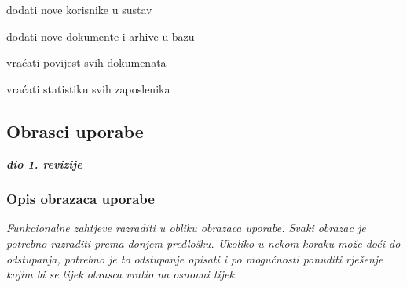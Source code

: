 \begin{packed_enum}
\begin{packed_enum}
					
				\end{packed_enum}
				
				\item  {}
				
				\begin{packed_enum}
					
					\item dodati nove korisnike u sustav
					\item dodati nove dokumente i arhive u bazu
					\item vraćati povijest svih dokumenata
					\item vraćati statistiku svih zaposlenika
					
				\end{packed_enum}	
			
			\end{packed_enum}
			
			
			\eject 
			
			
				
			\subsection{Obrasci uporabe}
				
				\textbf{\textit{dio 1. revizije}}
				
				\subsubsection{Opis obrazaca uporabe}
					\textit{Funkcionalne zahtjeve razraditi u obliku obrazaca uporabe. Svaki obrazac je potrebno razraditi prema donjem predlošku. Ukoliko u nekom koraku može doći do odstupanja, potrebno je to odstupanje opisati i po mogućnosti ponuditi rješenje kojim bi se tijek obrasca vratio na osnovni tijek.}\\
					

